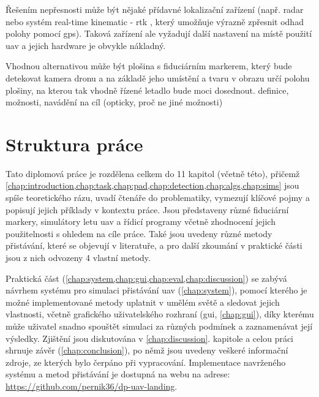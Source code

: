 Řešením nepřesnosti může být nějaké přídavné lokalizační zařízení (např. radar nebo systém real-time kinematic - \acrshort{rtk} \cite{rtk}, který umožňuje výrazně zpřesnit odhad polohy pomocí \acrshort{gps}). Taková zařízení ale vyžadují další nastavení na místě použití \acrshort{uav} a jejich hardware je obvykle nákladný.

Vhodnou alternativou může být plošina s fiduciárním markerem, který bude detekovat kamera dronu a na základě jeho umístění a tvaru v obrazu určí polohu plošiny, na kterou tak vhodně řízené letadlo bude moci dosednout.
definice, možnosti, navádění na cíl (opticky, proč ne jiné možnosti)
\section{Struktura práce}
Tato diplomová práce je rozdělena celkem do 11 kapitol (včetně této), přičemž \cref{chap:introduction,chap:task,chap:pad,chap:detection,chap:algs,chap:sims} jsou spíše teoretického rázu, uvadí čtenáře do problematiky, vymezují klíčové pojmy a popisují jejich příklady v kontextu práce. Jsou představeny různé fiduciární markery, simulátory letu \acrshort{uav} a řídicí programy včetně zhodnocení jejich použitelnosti s ohledem na cíle práce. Také jsou uvedeny různé metody přistávání, které se objevují v literatuře, a pro další zkoumání v praktické části jsou z nich odvozeny 4 vlastní metody.

Praktická část (\cref{chap:system,chap:gui,chap:eval,chap:discussion}) se zabývá návrhem systému pro simulaci přistávání \acrshort{uav} (\cref{chap:system}), pomocí kterého je možné implementované metody uplatnit v umělém světě a sledovat jejich vlastnosti, včetně grafického uživatelského rozhraní (\acrshort{gui}, \cref{chap:gui}), díky kterému může uživatel snadno spouštět simulaci za různých podmínek a zaznamenávat její výsledky. Zjištění jsou diskutována v \cref*{chap:discussion}. kapitole a celou práci shrnuje závěr (\cref{chap:conclusion}), po němž jsou uvedeny veškeré informační zdroje, ze kterých bylo čerpáno při vypracování. Implementace navrženého systému a metod přistávání je dostupná na webu na adrese: \url{https://github.com/pernik36/dp-uav-landing}.